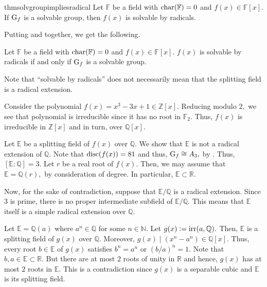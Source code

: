 \begin{restatable}[]{thm}{solvgroupimpliesradical}
\label{thm:solvgroupimpliesradical}
	Let $\mathbb{F}$ be a field with $\operatorname{char}(\mathbb{F}) = 0$ and $f(x) \in \mathbb{F}[x].$ If $\operatorname{G}_f$ is a solvable group, then $f(x)$ is solvable by radicals. \hfill\hyperref[thm:solvgroupimpliesradical2]{\downsym}
\end{restatable}

Putting  and  together, we get the following.

\begin{thm}
	Let $\mathbb{F}$ be a field with $\operatorname{char}(\mathbb{F}) = 0$ and $f(x) \in \mathbb{F}[x].$ $f(x)$ is solvable by radicals if and only if $\operatorname{G}_f$ is a solvable group. 
\end{thm}

\begin{ex}
	Note that ``solvable by radicals'' does not necessarily mean that the splitting field is a radical extension.

	Consider the polynomial $f(x) = x^3 - 3x + 1 \in \mathbb{Z}[x].$ Reducing modulo $2,$ we see that polynomial is irreducible since it has no root in $\mathbb{F}_2.$ Thus, $f(x)$ is irreducible in $\mathbb{Z}[x]$ and in turn, over $\mathbb{Q}[x].$

	Let $\mathbb{E}$ be a splitting field of $f(x)$ over $\mathbb{Q}.$ We show that $\mathbb{E}$ is not a radical extension of $\mathbb{Q}.$
	Note that $\operatorname{disc}(f(x)) = 81$ and thus, $\operatorname{G}_f \cong A_3,$ by . Thus, $[\mathbb{E} : \mathbb{Q}] = 3.$ Let $r$ be a real root of $f(x).$ Then, we may assume that $\mathbb{E} = \mathbb{Q}(r),$ by consideration of degree. In particular, $\mathbb{E} \subset \mathbb{R}.$ 

	Now, for the sake of contradiction, suppose that $\mathbb{E}/\mathbb{Q}$ is a radical extension. Since $3$ is prime, there is no proper intermediate subfield of $\mathbb{E}/\mathbb{Q}.$ This means that $\mathbb{E}$ itself is a simple radical extension over $\mathbb{Q}.$

	Let $\mathbb{E} = \mathbb{Q}(a)$ where $a^n \in \mathbb{Q}$ for some $n \in \mathbb{N}.$ Let $g(x) \vcentcolon= \operatorname{irr}(a, \mathbb{Q}).$ Then, $\mathbb{E}$ is a splitting field of $g(x)$ over $\mathbb{Q}.$ Moreover, $g(x) \mid (x^n - a^n) \in \mathbb{Q}[x].$ Thus, every root $b \in \mathbb{E}$ of $g(x)$ satisfies $b^n = a^n$ or $(b/a)^n = 1.$ Note that $b, a \in \mathbb{E} \subset \mathbb{R}.$ But there are at most $2$ roots of unity in $\mathbb{R}$ and hence, $g(x)$ has at most $2$ roots in $\mathbb{E}.$ This is a contradiction since $g(x)$ is a separable cubic and $\mathbb{E}$ is its splitting field.
\end{ex}